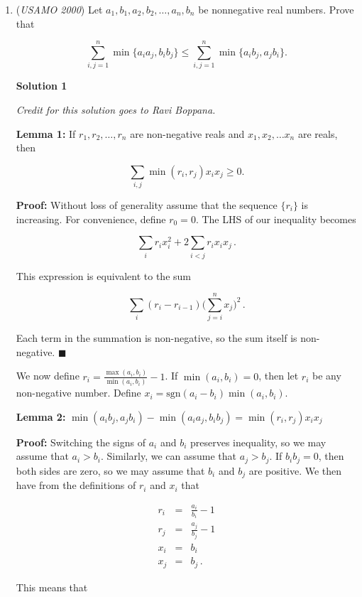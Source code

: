 \begin{enumerate}
 


	\item (\textit{USAMO 2000}) Let $a_1, b_1, a_2, b_2, \dots , a_n, b_n$ be nonnegative real numbers. Prove that


 
 \[\sum_{i, j = 1}^{n} \min\{a_ia_j, b_ib_j\} \le \sum_{i, j = 1}^{n} \min\{a_ib_j, a_jb_i\}.\]




\textbf{Solution 1}

\textit{Credit for this solution goes to Ravi Boppana.}

 \textbf{Lemma 1:} If $r_1, r_2, \ldots , r_n$ are non-negative reals and $x_1, x_2, \ldots x_n$ are reals, then

 
 \[\sum_{i, j}\min(r_{i}, r_{j}) x_{i}x_{j}\ge 0.\]

 \textbf{Proof:} Without loss of generality assume that the sequence $\{r_i\}$ is increasing. For convenience, define $r_0=0$. The LHS of our inequality becomes

 
 \[\sum_{i}r_{i}x_{i}^{2}+2\sum_{i < j}r_{i}x_{i}x_{j}\, .\]

 This expression is equivalent to the sum

 
 \[\sum_{i}(r_{i}-r_{i-1})\biggl(\sum_{j=i}^{n}x_{j}\biggr)^{2}\, .\]

 Each term in the summation is non-negative, so the sum itself is non-negative. $\blacksquare$

 We now define $r_i=\frac{\max(a_i,b_i)}{\min(a_i,b_i)}-1$. If $\min(a_i,b_i)=0$, then let $r_i$ be any non-negative number. Define $x_i=\text{sgn}(a_i-b_i)\min(a_i,b_i)$.

 \textbf{Lemma 2:} $\min(a_{i}b_{j}, a_{j}b_{i})-\min(a_{i}a_{j}, b_{i}b_{j}) =\min(r_{i}, r_{j}) x_{i}x_{j}$

 \textbf{Proof:} Switching the signs of $a_i$ and $b_i$ preserves inequality, so we may assume that $a_i>b_i$. Similarly, we can assume that $a_j>b_j$. If $b_ib_j=0$, then both sides are zero, so we may assume that $b_i$ and $b_j$ are positive. We then have from the definitions of $r_i$ and $x_i$ that

 
 \begin{eqnarray*}r_{i}& = &\frac{a_{i}}{b_{i}}-1\\ r_{j}& = &\frac{a_{j}}{b_{j}}-1\\ x_{i}& = & b_{i}\\ x_{j}& = & b_{j}\, .\end{eqnarray*}

 This means that


\end{enumerate}
